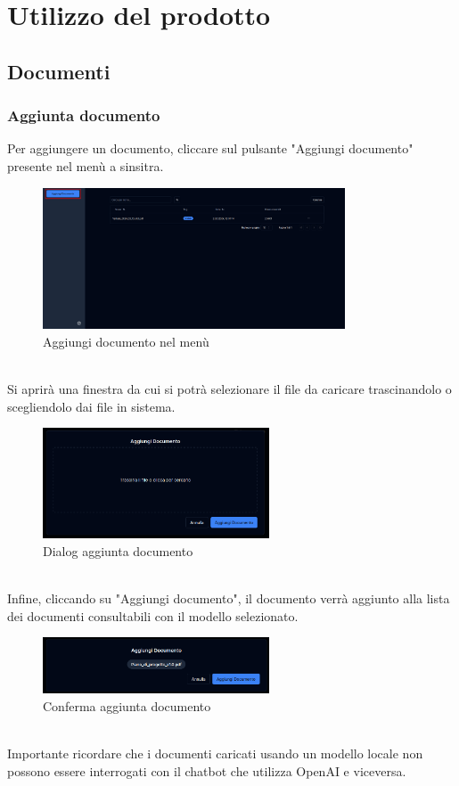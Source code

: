 \chapter{Utilizzo del prodotto}\label{chap:istruzioni}
\section{Documenti}\label{sec:documenti}
\subsection{Aggiunta documento}
Per aggiungere un documento, cliccare sul pulsante "Aggiungi documento" presente nel menù a sinsitra.
\begin{figure}[h!]
    \centering
    \includegraphics[width=0.8\textwidth]{schermatadocaggiungi.png}
    \caption{Aggiungi documento nel menù}\label{fig:adddocs}
\end{figure}
\\Si aprirà una finestra da cui si potrà selezionare il file da caricare trascinandolo o scegliendolo dai file in sistema.
\begin{figure}[h!]
    \centering
    \includegraphics[width=0.6\textwidth]{dialogadd.png}
    \caption{Dialog aggiunta documento}\label{fig:dialogadd}
\end{figure}
\\Infine, cliccando su "Aggiungi documento", il documento verrà aggiunto alla lista dei documenti consultabili con il modello selezionato.
\begin{figure}[h!]
    \centering
    \includegraphics[width=0.6\textwidth]{docadd.png}
    \caption{Conferma aggiunta documento}\label{fig:confirmadd}
\end{figure}
\\Importante ricordare che i documenti caricati usando un modello locale non possono essere interrogati con il chatbot che utilizza OpenAI e viceversa.
